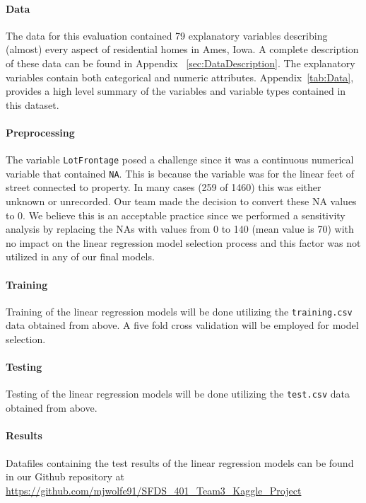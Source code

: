 \documentclass[11pt]{scrartcl} %
\begin{document}
\paragraph{Data} The data for this evaluation contained 79 explanatory variables describing (almost) every aspect of residential homes in Ames, Iowa. A complete description of these data can be found in Appendix ~\ref{sec:DataDescription}. The explanatory variables contain both categorical and numeric attributes.  Appendix~\ref{tab:Data}, provides a high level summary of the variables and variable types contained in this dataset.
\paragraph{Preprocessing} The variable \texttt{LotFrontage} posed a challenge since it was a continuous numerical variable that contained \texttt{NA}. This is because the variable was for the linear feet of street connected to property. In many cases (259 of 1460) this was either unknown or unrecorded. Our team made the decision to convert these NA values to 0. We believe this is an acceptable practice since we performed a sensitivity analysis by replacing the NAs with values from 0 to 140 (mean value is 70) with no impact on the linear regression model selection process and this factor was not utilized in any of our final models.
\paragraph{Training} Training of the linear regression models will be done utilizing the \texttt{training.csv} data obtained from above. A five fold cross validation will be employed for model selection. 
\paragraph{Testing} Testing of the linear regression models will be done utilizing the \texttt{test.csv} data obtained from above.
\paragraph{Results} Datafiles containing the test results of the linear regression models can be found in our Github repository at \href{https://github.com/mjwolfe91/SFDS_401_Team3_Kaggle_Project}{https://github.com/mjwolfe91/SFDS\_401\_Team3\_Kaggle\_Project}\\
			
\end{document}
